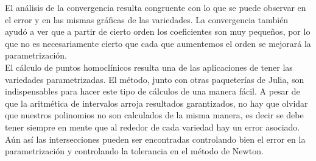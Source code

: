 El análisis de la convergencia resulta congruente con lo que se puede observar en el error y en las mismas gráficas de las variedades. La convergencia también ayudó a ver que a partir de cierto orden los coeficientes son muy pequeños, por lo que no es necesariamente cierto que cada que aumentemos el orden se mejorará la parametrización.\\


El cálculo de puntos homoclínicos resulta una de las aplicaciones de tener las variedades parametrizadas. El método, junto con otras paqueterías de Julia, son indispensables para hacer este tipo de cálculos de una manera fácil. A pesar de que la aritmética de intervalos arroja resultados garantizados, no hay que olvidar que nuestros polinomios no son calculados de la misma manera, es decir se debe tener siempre en mente que al rededor de cada variedad hay un error asociado. Aún así las intersecciones pueden ser encontradas controlando bien el error en la parametrización y controlando la tolerancia en el método de Newton.